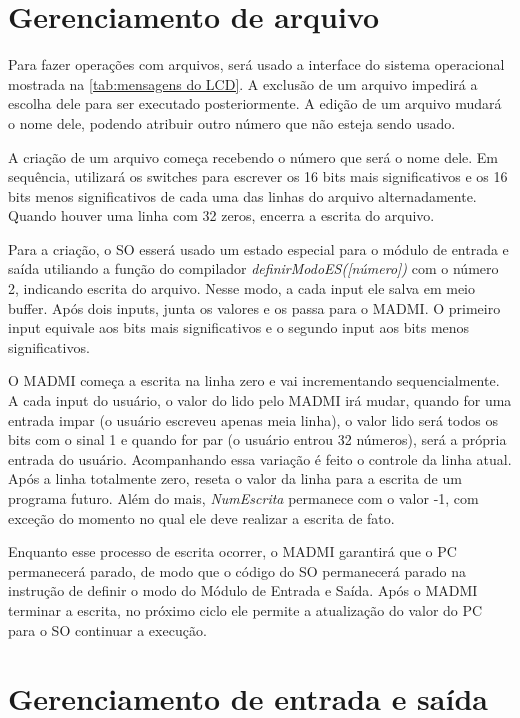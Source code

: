 \documentclass[
	12pt,				%
	oneside,
	a4paper,			%
	english,			%
	french,				%
	spanish,			%
	brazil,				%
	]{abntex2}
\begin{document}
\section{Gerenciamento de arquivo}

Para fazer operações com arquivos, será usado a interface do sistema operacional mostrada na \autoref{tab:mensagens do LCD}. A exclusão de um arquivo impedirá a escolha dele para ser executado posteriormente. A edição de um arquivo mudará o nome dele, podendo atribuir outro número que não esteja sendo usado. 

A criação de um arquivo começa recebendo o número que será o nome dele. Em sequência, utilizará os switches para escrever os 16 bits mais significativos e os 16 bits menos significativos de cada uma das linhas do arquivo alternadamente. Quando houver uma linha com 32 zeros, encerra a escrita do arquivo.

Para a criação, o SO esserá usado um estado especial para o módulo de entrada e saída utiliando a função do compilador \textit{definirModoES([número])} com o número 2, indicando escrita do arquivo. Nesse modo, a cada input ele salva em meio buffer. Após dois inputs, junta os valores e os passa para o MADMI. O primeiro input equivale aos bits mais significativos e o segundo input aos bits menos significativos.

O MADMI começa a escrita na linha zero e vai incrementando sequencialmente. A cada input do usuário, o valor do lido pelo MADMI irá mudar, quando for uma entrada impar (o usuário escreveu apenas meia linha), o valor lido será todos os bits com o sinal 1 e quando for par (o usuário entrou 32 números), será a própria entrada do usuário. Acompanhando essa variação é feito o controle da linha atual. Após a linha totalmente zero, reseta o valor da linha para a escrita de um programa futuro. Além do mais, \textit{NumEscrita} permanece com o valor -1, com exceção do momento no qual ele deve realizar a escrita de fato.

Enquanto esse processo de escrita ocorrer, o MADMI garantirá que o PC permanecerá parado, de modo que o código do SO permanecerá parado na instrução de definir o modo do Módulo de Entrada e Saída. Após o MADMI terminar a escrita, no próximo ciclo ele permite a atualização do valor do PC para o SO continuar a execução.

\section{Gerenciamento de entrada e saída}
\label{sec:gerenciamento_de_entrada_e_saida}
\end{document}
